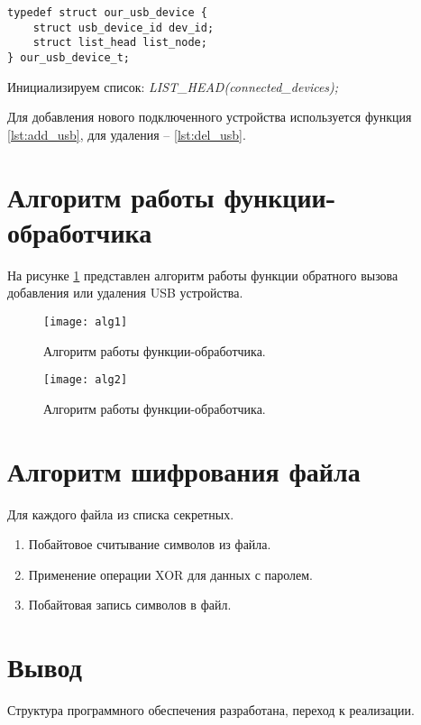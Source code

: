  \begin{lstlisting}[caption = Структура our\_usb\_device, label =  lst:our_usb_device]
typedef struct our_usb_device {
    struct usb_device_id dev_id;
    struct list_head list_node;
} our_usb_device_t;
 \end{lstlisting}
 
 Инициализируем список: \textit{LIST\_HEAD(connected\_devices);}

Для добавления нового подключенного устройства используется функция \ref{lst:add_usb},  для удаления -- \ref{lst:del_usb}.

\section{\textbf{Алгоритм работы функции-обработчика}}

На рисунке \ref{img:alg} представлен алгоритм работы функции обратного вызова добавления или удаления USB устройства.

\begin{figure}[H]
	\centering
	\texttt{[image: alg1]}
	\caption{Алгоритм работы функции-обработчика. }
	\label{img:alg}
\end{figure}

\begin{figure}[H]
	\centering
	\texttt{[image: alg2]}
	\caption{Алгоритм работы функции-обработчика. }
	\label{img:alg1}
\end{figure}

\section{\textbf{Алгоритм шифрования файла}}

Для каждого файла из списка секретных.
 
\begin{enumerate}
\item[1. ] Побайтовое считывание символов из файла. 
\item[2. ] Применение операции XOR для данных с паролем. 
\item[3. ] Побайтовая запись символов в файл.  
\end{enumerate}


\section{\textbf{Вывод}}

\hfill

Структура программного обеспечения разработана, переход к реализации. 
